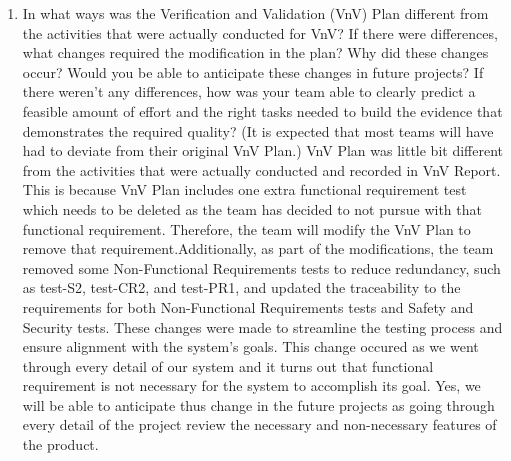 \documentclass[12pt, titlepage]{article}
\begin{document}
\begin{enumerate}
  \item In what ways was the Verification and Validation (VnV) Plan different
  from the activities that were actually conducted for VnV?  If there were
  differences, what changes required the modification in the plan?  Why did
  these changes occur?  Would you be able to anticipate these changes in future
  projects?  If there weren't any differences, how was your team able to clearly
  predict a feasible amount of effort and the right tasks needed to build the
  evidence that demonstrates the required quality?  (It is expected that most
  teams will have had to deviate from their original VnV Plan.)
  VnV Plan was little bit different from the activities that were actually conducted and recorded in VnV Report. This is because VnV Plan includes one extra functional requirement test which needs to be deleted as the team has decided to not pursue with that functional requirement. Therefore, the team will modify the VnV Plan to remove that requirement.Additionally, as part of the modifications, the team removed some Non-Functional Requirements tests to reduce redundancy, such as test-S2, test-CR2, and test-PR1, and updated the traceability to the requirements for both Non-Functional Requirements tests and Safety and Security tests. These changes were made to streamline the testing process and ensure alignment with the system's goals. This change occured as we went through every detail of our system and it turns out that functional requirement is not necessary for the system to accomplish its goal. Yes, we will be able to anticipate thus change in the future projects as going through every detail of the project review the necessary and non-necessary features of the product.  

\end{enumerate}
\end{document}
